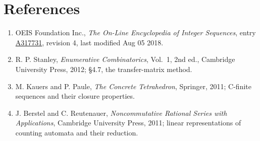 \documentclass[11pt]{article}
\theoremstyle{definition}
\begin{document}
\section{References}

\begin{enumerate}

\item OEIS Foundation Inc., \emph{The On-Line Encyclopedia of Integer Sequences}, entry \href{https://oeis.org/A317731}{A317731}, revision 4, last modified Aug 05 2018.

\item R. P. Stanley, \emph{Enumerative Combinatorics}, Vol.~1, 2nd ed., Cambridge University Press, 2012; \S4.7, the transfer-matrix method.

\item M. Kauers and P. Paule, \emph{The Concrete Tetrahedron}, Springer, 2011; C-finite sequences and their closure properties.

\item J. Berstel and C. Reutenauer, \emph{Noncommutative Rational Series with Applications}, Cambridge University Press, 2011; linear representations of counting automata and their reduction.

\end{enumerate}
\end{document}
